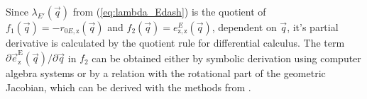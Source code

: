 \documentclass[graybox,vecphys]{svmult}
\begin{document}
%
Since ${\lambda_{E'}(\vec{q})}$ from (\ref{eq:lambda_Edash}) is the quotient of  ${f_\mathrm{1}(\vec{q})} = {-{r_{0E,\mathrm{z}}(\vec{q})}}$ and ${f_\mathrm{2}(\vec{q})} = {e_\mathrm{z,z}^E(\vec{q})}$, dependent on $\vec{q}$, it's partial derivative is calculated by the quotient rule for differential calculus.
The term ${\partial{\vec{e}_{\mathrm{z}}^\mathrm{E}}(\vec{q})}/{\partial\vec{q}}$ in $f_\mathrm{2}$ can be obtained either by symbolic derivation using computer algebra systems or by a relation with the rotational part of the geometric Jacobian, which can be derived with the methods from \cite{SchapplerTapOrt2019a}. %
\end{document}
